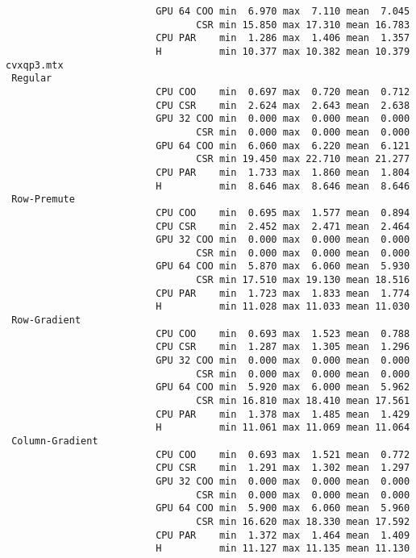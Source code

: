 \begin{verbatim}
                          GPU 64 COO min  6.970 max  7.110 mean  7.045
                                 CSR min 15.850 max 17.310 mean 16.783
                          CPU PAR    min  1.286 max  1.406 mean  1.357
                          H          min 10.377 max 10.382 mean 10.379
cvxqp3.mtx
 Regular
                          CPU COO    min  0.697 max  0.720 mean  0.712
                          CPU CSR    min  2.624 max  2.643 mean  2.638
                          GPU 32 COO min  0.000 max  0.000 mean  0.000
                                 CSR min  0.000 max  0.000 mean  0.000
                          GPU 64 COO min  6.060 max  6.220 mean  6.121
                                 CSR min 19.450 max 22.710 mean 21.277
                          CPU PAR    min  1.733 max  1.860 mean  1.804
                          H          min  8.646 max  8.646 mean  8.646
 Row-Premute
                          CPU COO    min  0.695 max  1.577 mean  0.894
                          CPU CSR    min  2.452 max  2.471 mean  2.464
                          GPU 32 COO min  0.000 max  0.000 mean  0.000
                                 CSR min  0.000 max  0.000 mean  0.000
                          GPU 64 COO min  5.870 max  6.060 mean  5.930
                                 CSR min 17.510 max 19.130 mean 18.516
                          CPU PAR    min  1.723 max  1.833 mean  1.774
                          H          min 11.028 max 11.033 mean 11.030
 Row-Gradient
                          CPU COO    min  0.693 max  1.523 mean  0.788
                          CPU CSR    min  1.287 max  1.305 mean  1.296
                          GPU 32 COO min  0.000 max  0.000 mean  0.000
                                 CSR min  0.000 max  0.000 mean  0.000
                          GPU 64 COO min  5.920 max  6.000 mean  5.962
                                 CSR min 16.810 max 18.410 mean 17.561
                          CPU PAR    min  1.378 max  1.485 mean  1.429
                          H          min 11.061 max 11.069 mean 11.064
 Column-Gradient
                          CPU COO    min  0.693 max  1.521 mean  0.772
                          CPU CSR    min  1.291 max  1.302 mean  1.297
                          GPU 32 COO min  0.000 max  0.000 mean  0.000
                                 CSR min  0.000 max  0.000 mean  0.000
                          GPU 64 COO min  5.900 max  6.060 mean  5.960
                                 CSR min 16.620 max 18.330 mean 17.592
                          CPU PAR    min  1.372 max  1.464 mean  1.409
                          H          min 11.127 max 11.135 mean 11.130

\end{verbatim}
